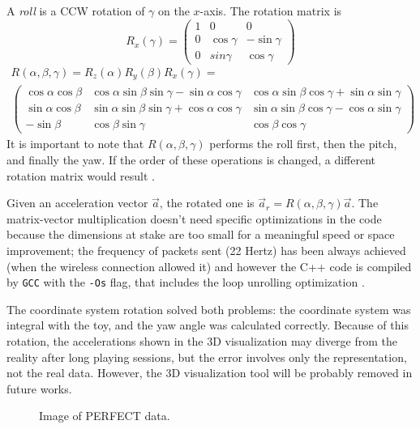 A \textit{roll} is a CCW rotation of $\gamma$ on the $x$-axis. The rotation matrix is
\[
	R_x(\gamma) =
	\begin{pmatrix}
		1 & 0 & 0 \\
		0 & \cos\gamma & -\sin\gamma \\
		0 & sin\gamma & \cos\gamma
	\end{pmatrix}
\]
\begin{gather*}
	R(\alpha, \beta, \gamma) = R_z(\alpha) R_y(\beta) R_x(\gamma) = \\
	\begin{pmatrix}
		\cos\alpha \cos\beta & \cos\alpha \sin\beta \sin\gamma - \sin\alpha \cos\gamma & \cos\alpha \sin\beta \cos\gamma + \sin\alpha \sin\gamma \\
		\sin\alpha \cos\beta & \sin\alpha \sin\beta \sin\gamma + \cos\alpha \cos\gamma & \sin\alpha \sin\beta \cos\gamma - \cos\alpha \sin\gamma \\
		-\sin\beta & \cos\beta \sin\gamma & \cos\beta \cos\gamma
	\end{pmatrix}
\end{gather*}
It is important to note that $R(\alpha, \beta, \gamma)$ performs the roll first, then the pitch, and finally the yaw. If the order of these operations is changed, a different rotation matrix would result \cite{Lav06}.
\bigbreak

Given an acceleration vector $\vec a$, the rotated one is $\vec a_r = R(\alpha, \beta, \gamma) \vec a$.
The matrix-vector multiplication doesn't need specific optimizations in the code because the dimensions at stake are too small for a meaningful speed or space improvement; the frequency of packets sent (22 Hertz) has been always achieved (when the wireless connection allowed it) and however the C++ code is compiled by \texttt{GCC} with the \texttt{-Os} flag, that includes the loop unrolling optimization \cite{UsingGCC}.
\bigbreak

The coordinate system rotation solved both problems: the coordinate system was integral with the toy, and the yaw angle was calculated correctly. Because of this rotation, the accelerations shown in the 3D visualization may diverge from the reality after long playing sessions, but the error involves only the representation, not the real data. However, the 3D visualization tool will be probably removed in future works.
\bigbreak

\begin{center}
	\begin{figure}[ht!]
		\caption{Image of PERFECT data.}
	\end{figure}
\end{center}

